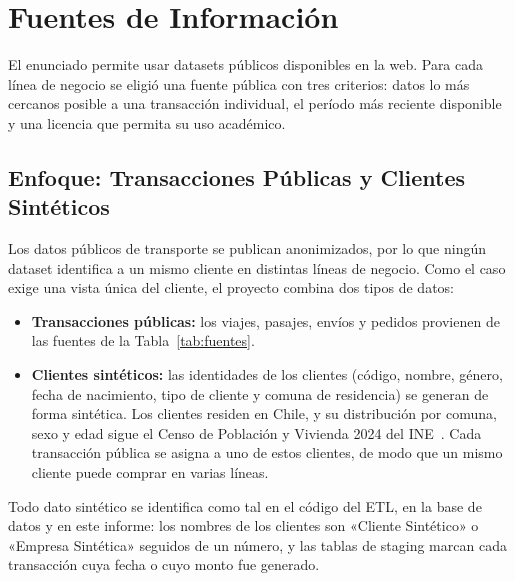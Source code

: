 \section{Fuentes de Información}
\label{sec:fuentes}

El enunciado permite usar datasets públicos disponibles en la web. Para cada
línea de negocio se eligió una fuente pública con tres criterios: datos lo más
cercanos posible a una transacción individual, el período más reciente
disponible y una licencia que permita su uso académico.

\subsection{Enfoque: Transacciones Públicas y Clientes Sintéticos}

Los datos públicos de transporte se publican anonimizados, por lo que ningún
dataset identifica a un mismo cliente en distintas líneas de negocio. Como el
caso exige una vista única del cliente, el proyecto combina dos tipos de
datos:

\begin{itemize}[leftmargin=*]
  \item \textbf{Transacciones públicas:} los viajes, pasajes, envíos y
        pedidos provienen de las fuentes de la Tabla~\ref{tab:fuentes}.
  \item \textbf{Clientes sintéticos:} las identidades de los clientes (código,
        nombre, género, fecha de nacimiento, tipo de cliente y comuna de
        residencia) se generan de forma sintética. Los clientes residen en
        Chile, y su distribución por comuna, sexo y edad sigue el Censo de
        Población y Vivienda 2024 del INE~\cite{ine_censo2024}. Cada
        transacción pública se asigna a uno de estos clientes, de modo que un
        mismo cliente puede comprar en varias líneas.
\end{itemize}

Todo dato sintético se identifica como tal en el código del ETL, en la base de
datos y en este informe: los nombres de los clientes son «Cliente Sintético» o
«Empresa Sintética» seguidos de un número, y las tablas de staging marcan cada
transacción cuya fecha o cuyo monto fue generado.

